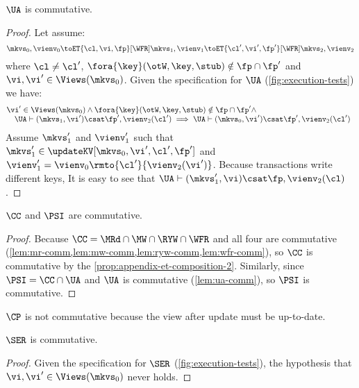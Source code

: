 \begin{lemma}
    \label{lem:ua-comm}
    \(\UA\) is commutative.
\end{lemma}
\begin{proof}
    Let assume:
    \[
        \mkvs_0, \vienv_0 \toET{\cl, \vi, \fp}[\WFR] \mkvs_1, \vienv_1 \toET{\cl', \vi', \fp'}[\WFR] \mkvs_2, \vienv_2 
    \]
    where \( \cl \neq \cl' \), \( \fora{ \key } (\otW, \key, \stub) \notin \fp \cap \fp' \) and \( \vi, \vi' \in \Views(\mkvs_0)\).
    Given the specification for \( \UA \) (\cref{fig:execution-tests}) we have:
    \[
        \begin{array}{@{}l}
            \vi' \in \Views(\mkvs_0) \land \fora{ \key } (\otW, \key, \stub) \notin \fp \cap \fp' \land \\ 
            \quad \UA \vdash (\mkvs_1, \vi') \csat \fp', \vienv_2(\cl') \implies  \UA \vdash (\mkvs_0, \vi') \csat \fp', \vienv_2(\cl')
        \end{array}
    \]
    Assume \( \mkvs'_1 \) and \( \vienv'_1 \) such that \( \mkvs'_1 \in \updateKV[\mkvs_0,\vi',\cl',\fp'] \) and \( \vienv'_1 = \vienv_0\rmto{\cl'}{\vienv_2(\vi')} \).
    Because transactions write different keys, It is easy to see that \( \UA \vdash (\mkvs'_1, \vi) \csat \fp, \vienv_2(\cl) \).
\end{proof}

\begin{proposition}
    \( \CC \) and \( \PSI \) are commutative.
\end{proposition}
\begin{proof}
    Because \( \CC = \MRd \cap \MW \cap \RYW \cap \WFR \) and all four are commutative (\cref{lem:mr-comm,lem:mw-comm,lem:ryw-comm,lem:wfr-comm}), so \( \CC \) is commutative by the \cref{prop:appendix-et-composition-2}.
    Similarly, since \( \PSI = \CC \cap \UA \) and \( \UA \) is commutative (\cref{lem:ua-comm}), so \( \PSI \) is commutative.
\end{proof}

\( \CP \) is not commutative because the view after update must be up-to-date.

\begin{lemma}
    \label{lem:ser-comm}
    \( \SER \) is commutative.
\end{lemma}
\begin{proof}
    Given the specification for \( \SER \) (\cref{fig:execution-tests}), the hypothesis that \( \vi, \vi' \in \Views(\mkvs_0) \) never holds.
\end{proof}

